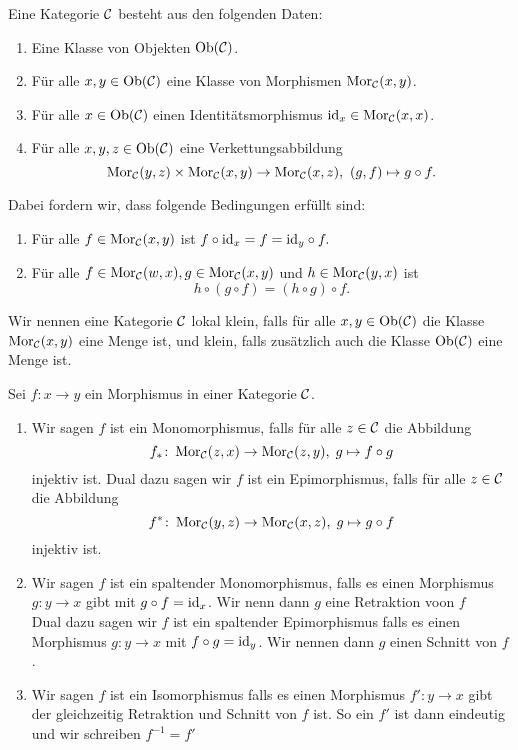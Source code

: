 \begin{Def}[Kategorie]
    Eine Kategorie $\mathcal{C}$ besteht aus den folgenden Daten:
    \begin{enumerate}
        \item Eine Klasse von Objekten $\operatorname{Ob}(\mathcal{C})$.
        \item Für alle $x,y\in\operatorname{Ob}(\mathcal{C})$ eine Klasse von Morphismen $\operatorname{Mor}_{\mathcal{C}}(x,y)$.
        \item Für alle $x\in\operatorname{Ob}(\mathcal{C})$ einen Identitätsmorphismus $\mathrm{id}_x\in\operatorname{Mor}_{\mathcal{C}}(x,x)$.
        \item Für alle $x,y,z\in\operatorname{Ob}(\mathcal{C})$ eine Verkettungsabbildung 
        $$\operatorname{Mor}_{\mathcal{C}}(y,z)\times \operatorname{Mor}_{\mathcal{C}}(x,y)\to \operatorname{Mor}_{\mathcal{C}}(x,z),\ (g,f)\mapsto g\circ f.$$
    \end{enumerate}
    Dabei fordern wir, dass folgende Bedingungen erfüllt sind:
    \begin{enumerate}
        \item Für alle $f\in\operatorname{Mor}_{\mathcal{C}}(x,y)$ ist
        $f\circ \mathrm{id}_x=f=\mathrm{id}_y\circ f.$
        \item Für alle $f\in\operatorname{Mor}_{\mathcal{C}}(w,x), g\in\operatorname{Mor}_{\mathcal{C}}(x,y)$ und $h\in\operatorname{Mor}_{\mathcal{C}}(y,x)$ ist 
        $$h\circ (g\circ f)=(h\circ g)\circ f.$$
    \end{enumerate}
    Wir nennen eine Kategorie $\mathcal{C}$ lokal klein, falls für alle $x,y\in\operatorname{Ob}(\mathcal{C})$ die Klasse $\operatorname{Mor}_{\mathcal{C}}(x,y)$ eine Menge ist, und klein, falls zusätzlich auch die Klasse $\operatorname{Ob}(\mathcal{C})$ eine Menge ist.
\end{Def}
\begin{Def}
    Sei $f\colon x\to y$ ein Morphismus in einer Kategorie $\mathcal{C}$.
    \begin{enumerate}
        \item Wir sagen $f$ ist ein Monomorphismus, falls für alle $z\in\mathcal{C}$ die Abbildung 
        $$f_*\colon \operatorname{Mor}_{\mathcal{C}}(z,x)\to\operatorname{Mor}_{\mathcal{C}}(z,y),\; g\mapsto f\circ g$$ injektiv ist.
        Dual dazu sagen wir $f$ ist ein Epimorphismus, falls für alle $z\in\mathcal{C}$ die Abbildung
        $$f^*\colon\operatorname{Mor}_{\mathcal{C}}(y,z)\to\operatorname{Mor}_{\mathcal{C}}(x,z),\; g\mapsto g\circ f$$ injektiv ist.
        \item Wir sagen $f$ ist ein spaltender Monomorphismus, falls es einen Morphismus $g\colon y\to x$ gibt mit $g\circ f=\mathrm{id}_x$. Wir nenn dann $g$ eine Retraktion voon $f$\\
        Dual dazu sagen wir $f$ ist ein spaltender Epimorphismus falls es einen Morphismus $g\colon y\to x$ mit $f\circ g=\mathrm{id}_y$. Wir nennen dann $g$ einen Schnitt von $f$.
        \item Wir sagen $f$ ist ein Isomorphismus falls es einen Morphismus $f'\colon y\to x$ gibt der gleichzeitig Retraktion und Schnitt von $f$ ist. So ein $f'$ ist dann eindeutig und wir schreiben $f^{-1}=f'$
    \end{enumerate}
\end{Def}
